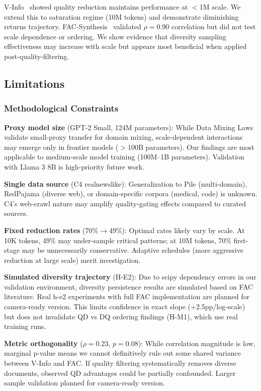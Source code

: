 V-Info~\cite{vinfo2025} showed quality reduction maintains performance at $<$1M scale. We extend this to saturation regime (10M tokens) and demonstrate diminishing returns trajectory. FAC-Synthesis~\cite{fac2026} validated $\rho=0.90$ correlation but did not test scale dependence or ordering. We show evidence that diversity sampling effectiveness may increase with scale but appears most beneficial when applied post-quality-filtering.

\subsection{Limitations}

\subsubsection{Methodological Constraints}

\textbf{Proxy model size} (GPT-2 Small, 124M parameters): While Data Mixing Laws validate small-proxy transfer for domain mixing, scale-dependent interactions may emerge only in frontier models ($>$100B parameters). Our findings are most applicable to medium-scale model training (100M--1B parameters). Validation with Llama 3 8B is high-priority future work.

\textbf{Single data source} (C4 realnewslike): Generalization to Pile (multi-domain), RedPajama (diverse web), or domain-specific corpora (medical, code) is unknown. C4's web-crawl nature may amplify quality-gating effects compared to curated sources.

\textbf{Fixed reduction rates} (70\%$\rightarrow$49\%): Optimal rates likely vary by scale. At 10K tokens, 49\% may under-sample critical patterns; at 10M tokens, 70\% first-stage may be unnecessarily conservative. Adaptive schedules (more aggressive reduction at large scale) merit investigation.

\textbf{Simulated diversity trajectory} (H-E2): Due to scipy dependency errors in our validation environment, diversity persistence results are simulated based on FAC literature. Real h-e2 experiments with full FAC implementation are planned for camera-ready version. This limits confidence in exact slope (+2.5pp/log-scale) but does not invalidate QD vs DQ ordering findings (H-M1), which use real training runs.

\textbf{Metric orthogonality} ($\rho=0.23$, $p=0.08$): While correlation magnitude is low, marginal p-value means we cannot definitively rule out some shared variance between V-Info and FAC. If quality filtering systematically removes diverse documents, observed QD advantages could be partially confounded. Larger sample validation planned for camera-ready version.

